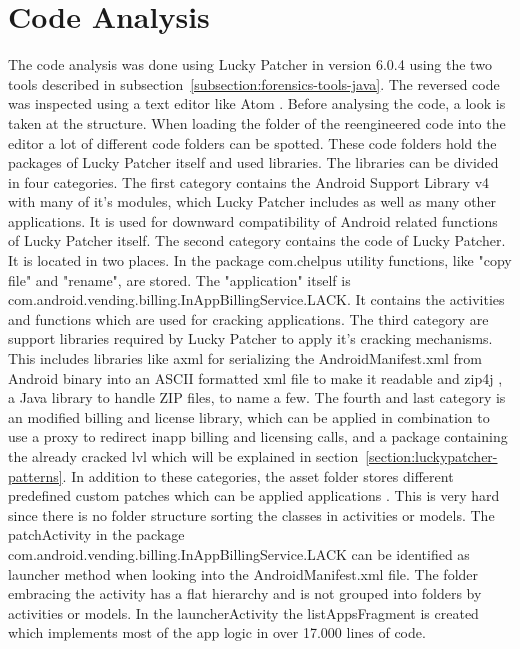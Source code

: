 \section{Code Analysis} \label{section:luckypatcher-analysis}
The code analysis was done using Lucky Patcher in version 6.0.4 using the two tools described in subsection~\ref{subsection:forensics-tools-java}.
The reversed code was inspected using a text editor like Atom \cite{atom}.
\newline
Before analysing the code, a look is taken at the structure.
When loading the folder of the reengineered code into the editor a lot of different code folders can be spotted.
These code folders hold the packages of Lucky Patcher itself and used libraries.
The libraries can be divided in four categories.
The first category contains the Android Support Library v4 with many of it's modules, which Lucky Patcher includes as well as many other applications.
It is used for downward compatibility of Android related functions of Lucky Patcher itself.
The second category contains the code of Lucky Patcher. It is located in two places.
In the package com.chelpus utility functions, like "copy file" and "rename", are stored.
The "application" itself is com.android.vending.billing.InAppBillingService.LACK. It contains the activities and functions which are used for cracking applications.
The third category are support libraries required by Lucky Patcher to apply it's cracking mechanisms.
This includes libraries like axml \cite{axml} for serializing the AndroidManifest.xml from Android binary into an ASCII formatted xml file to make it readable and zip4j \cite{zip4j}, a Java library to handle ZIP files, to name a few.
The fourth and last category is an modified billing and license library, which can be applied in combination to use a proxy to redirect inapp billing and licensing calls, and a package containing the already cracked \gls{lvl} which will be explained in section~\ref{section:luckypatcher-patterns}.
In addition to these categories, the asset folder stores different predefined custom patches which can be applied applications \cite{munteanLicense}.
\newline
This is very hard since there is no folder structure sorting the classes in activities or models.
The patchActivity in the package com.android.vending.billing.InAppBillingService.LACK can be identified as launcher method when looking into the AndroidManifest.xml file.
The folder embracing the activity has a flat hierarchy and is not grouped into folders by activities or models.
In the launcherActivity the listAppsFragment is created which implements most of the app logic in over 17.000 lines of code.
